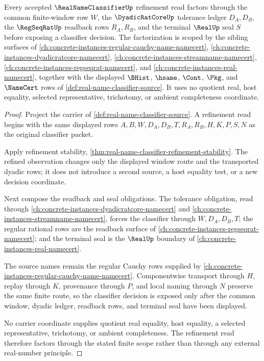 \begin{theorem}
\label{thm:real-name-classifier-refinement-scope-factorization}
Every accepted $\RealNameClassifierUp$ refinement read factors through the common finite-window row $W$, the $\DyadicRatCoreUp$ tolerance ledger $D_A,D_B$, the $\RegSeqRatUp$ readback rows $R_A,R_B$, and the terminal $\RealUp$ seal $S$ before exposing a classifier decision. The factorization is scoped by the sibling surfaces of \autoref{ch:concrete-instances-regular-cauchy-name-namecert}, \autoref{ch:concrete-instances-dyadicratcore-namecert}, \autoref{ch:concrete-instances-streamname-namecert}, \autoref{ch:concrete-instances-regseqrat-namecert}, and \autoref{ch:concrete-instances-real-namecert}, together with the displayed $\BHist$, $\hsame$, $\Cont$, $\Pkg$, and $\NameCert$ rows of \autoref{def:real-name-classifier-source}. It uses no quotient real, host equality, selected representative, trichotomy, or ambient completeness coordinate.
\end{theorem}
\begin{proof}
Project the carrier of \autoref{def:real-name-classifier-source}. A refinement read begins with the same displayed rows $A,B,W,D_A,D_B,T,R_A,R_B,H,K,P,S,N$ as the original classifier packet.

Apply refinement stability, \autoref{thm:real-name-classifier-refinement-stability}. The refined observation changes only the displayed window route and the transported dyadic rows; it does not introduce a second source, a host equality test, or a new decision coordinate.

Next compose the readback and seal obligations. The tolerance obligation, read through \autoref{ch:concrete-instances-dyadicratcore-namecert} and \autoref{ch:concrete-instances-streamname-namecert}, forces the classifier through $W,D_A,D_B,T$; the regular rational rows are the readback surface of \autoref{ch:concrete-instances-regseqrat-namecert}; and the terminal seal is the $\RealUp$ boundary of \autoref{ch:concrete-instances-real-namecert}.

The source names remain the regular Cauchy rows supplied by \autoref{ch:concrete-instances-regular-cauchy-name-namecert}. Componentwise transport through $H$, replay through $K$, provenance through $P$, and local naming through $N$ preserve the same finite route, so the classifier decision is exposed only after the common window, dyadic ledger, readback rows, and terminal seal have been displayed.

No carrier coordinate supplies quotient real equality, host equality, a selected representative, trichotomy, or ambient completeness. The refinement read therefore factors through the stated finite scope rather than through any external real-number principle.
\end{proof}

